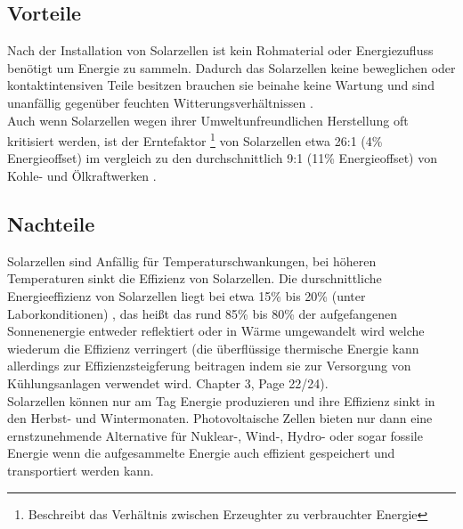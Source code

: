 \subsection{Vorteile}
    Nach der Installation von Solarzellen ist kein Rohmaterial oder
    Energiezufluss benötigt um Energie zu sammeln. Dadurch das
    Solarzellen keine beweglichen oder kontaktintensiven Teile besitzen
    brauchen sie beinahe keine Wartung und sind unanfällig gegenüber
    feuchten Witterungsverhältnissen \cite{SolarMaintenance}.\\
    Auch wenn Solarzellen wegen ihrer Umweltunfreundlichen Herstellung
    oft kritisiert werden, ist der Erntefaktor \footnote{Beschreibt das
    Verhältnis zwischen Erzeughter zu verbrauchter Energie} von
    Solarzellen etwa 26:1 (4\% Energieoffset) im vergleich zu den
    durchschnittlich 9:1 (11\% Energieoffset) von Kohle- und
    Ölkraftwerken \cite{SolarCarbonEmissions}.

\subsection{Nachteile}
    Solarzellen sind Anfällig für Temperaturschwankungen, bei
    höheren Temperaturen sinkt die Effizienz von Solarzellen. Die
    durschnittliche Energieeffizienz von Solarzellen liegt bei etwa
    15\% bis 20\% (unter Laborkonditionen) \cite{SolarEfficiency}, das
    heißt das rund 85\% bis 80\% der aufgefangenen Sonnenenergie
    entweder reflektiert oder in Wärme umgewandelt wird welche wiederum
    die Effizienz verringert (die überflüssige thermische Energie kann
    allerdings zur Effizienzsteigferung beitragen indem sie zur
    Versorgung von Kühlungsanlagen verwendet wird.
    \cite{YouTube_RE-SolarFlaw, PhotovoltaicPrinciples} Chapter 3,
    Page 22/24).\\
    Solarzellen können nur am Tag Energie produzieren und ihre Effizienz
    sinkt in den Herbst- und Wintermonaten. Photovoltaische Zellen bieten
    nur dann eine ernstzunehmende Alternative für Nuklear-, Wind-, Hydro-
    oder sogar fossile Energie wenn die aufgesammelte Energie auch
    effizient gespeichert und transportiert werden kann.